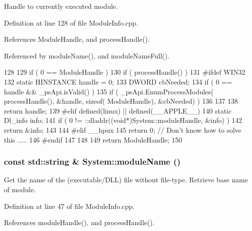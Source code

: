 Handle to currently executed module. 

Definition at line 128 of file ModuleInfo.cpp.

References ModuleHandle, and processHandle().

Referenced by moduleName(), and moduleNameFull().


\begin{DoxyCode}
128                                           {
129   if ( 0 == ModuleHandle )    {
130     if ( processHandle() )    {
131 #ifdef WIN32
132       static HINSTANCE handle = 0;
133       DWORD   cbNeeded;
134       if ( 0 == handle && _psApi.isValid() )    {
135         if ( _psApi.EnumProcessModules( processHandle(), &handle, sizeof(
      ModuleHandle), &cbNeeded) )   {
136         }
137       }
138       return handle;
139 #elif defined(linux) || defined(__APPLE__)
140       static Dl_info info;
141       if ( 0 != ::dladdr((void*)System::moduleHandle, &info) ) {
142     return &info;
143       }
144 #elif __hpux
145       return 0;  // Don't know how to solve this .....
146 #endif
147     }
148   }
149   return ModuleHandle;
150 }
\end{DoxyCode}
\hypertarget{namespaceSystem_add155d288552032434ee9e25d130ad72}{
\subsubsection[{moduleName}]{\setlength{\rightskip}{0pt plus 5cm}const std::string \& System::moduleName ()}}
\label{namespaceSystem_add155d288552032434ee9e25d130ad72}


Get the name of the (executable/DLL) file without file-\/type. Retrieve base name of module. 

Definition at line 47 of file ModuleInfo.cpp.

References moduleHandle(), and processHandle().


